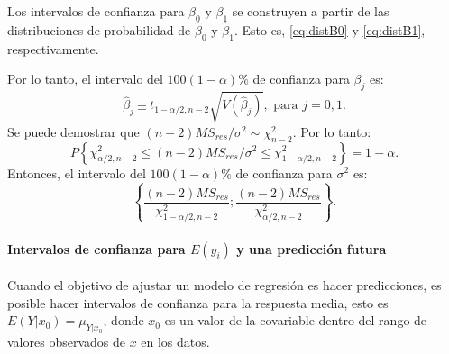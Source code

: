 \documentclass[
]{article}
\begin{document}
Los intervalos de confianza para \(\beta_{0}\) y \(\beta_{1}\) se construyen a partir de las distribuciones de probabilidad de \(\widehat{\beta}_{0}\) y \(\widehat{\beta}_{1}\). Esto es, \eqref{eq:distB0} y \eqref{eq:distB1}, respectivamente.

Por lo tanto, el intervalo del \(100(1-\alpha)\%\) de confianza para \(\beta_{j}\) es:
\[
\widehat{\beta}_{j} \pm t_{1-\alpha/2,n-2}\sqrt{V(\widehat{\beta}_{j})}, \mbox{ para }j=0,1.
\]
Se puede demostrar que \((n-2)MS_{res}/\sigma^{2}\sim \chi^{2}_{n-2}\). Por lo tanto:
\[
P \left\{ \chi^{2}_{\alpha/2,n-2} \leq (n-2)MS_{res}/\sigma^{2} \leq \chi^{2}_{1-\alpha/2,n-2} \right\} = 1-\alpha.
\]
Entonces, el intervalo del \(100(1-\alpha)\%\) de confianza para \(\sigma^{2}\) es:
\[
\left\{ \frac{(n-2)MS_{res}}{\chi^{2}_{1-\alpha/2,n-2}}; \frac{(n-2)MS_{res}}{\chi^{2}_{\alpha/2,n-2}} \right\}.
\]

\hypertarget{intervalos-de-confianza-para-ey_i-y-una-predicciuxf3n-futura}{%
\paragraph*{\texorpdfstring{Intervalos de confianza para \(E(y_{i})\) y una predicción futura}{Intervalos de confianza para E(y\_\{i\}) y una predicción futura}}\label{intervalos-de-confianza-para-ey_i-y-una-predicciuxf3n-futura}}

Cuando el objetivo de ajustar un modelo de regresión es hacer predicciones, es posible hacer intervalos de confianza para la respuesta media, esto es \(E(Y|x_{0})=\mu_{Y|x_{0}}\), donde \(x_{0}\) es un valor de la covariable dentro del rango de valores observados de \(x\) en los datos.
\end{document}
